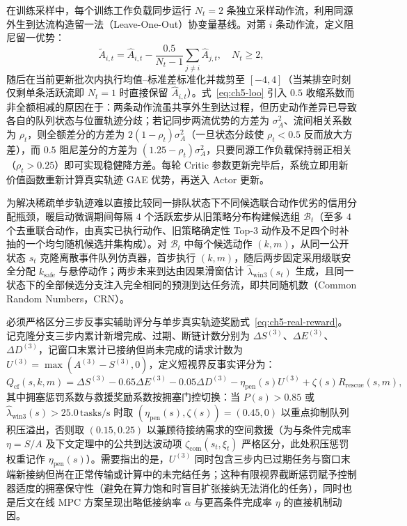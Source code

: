 在训练采样中，每个训练工作负载同步运行 $N_t=2$ 条独立采样动作流，利用同源外生到达流构造留一法（Leave-One-Out）协变量基线\cite{kool2019buy}。对第 $i$ 条动作流，定义阻尼留一优势：
\begin{equation}
 \widetilde A_{i,t}=\widehat A_{i,t}
 -\frac{0.5}{N_t-1}\sum_{j\neq i}\widehat A_{j,t},\quad N_t\geq2,
 \label{eq:ch5-loo}
\end{equation}
随后在当前更新批次内执行均值--标准差标准化并裁剪至 $[-4,4]$（当某排空时刻仅剩单条活跃流即 $N_t=1$ 时直接保留 $\widehat A_{i,t}$）。式~\eqref{eq:ch5-loo} 引入 $0.5$ 收缩系数而非全额相减的原因在于：两条动作流虽共享外生到达过程，但历史动作差异已导致各自的队列状态与位置轨迹分歧；若记同步两流优势的方差为 $\sigma_A^2$、流间相关系数为 $\rho_t$，则全额差分的方差为 $2(1-\rho_t)\sigma_A^2$（一旦状态分歧使 $\rho_t<0.5$ 反而放大方差），而 $0.5$ 阻尼差分的方差为 $(1.25-\rho_t)\sigma_A^2$，只要同源工作负载保持弱正相关（$\rho_t>0.25$）即可实现稳健降方差。每轮 Critic 参数更新完毕后，系统立即用新价值函数重新计算真实轨迹 GAE 优势，再送入 Actor 更新。

为解决稀疏单步轨迹难以直接比较同一排队状态下不同候选联合动作优劣的信用分配瓶颈，暖启动微调期间每隔 $4$ 个活跃宏步从旧策略分布构建候选组 $\mathcal{B}_t$（至多 $4$ 个去重联合动作，由真实已执行动作、旧策略确定性 Top-3 动作及不足四个时补抽的一个均匀随机候选并集构成）。对 $\mathcal{B}_t$ 中每个候选动作 $(k,m)$，从同一公开状态 $s_t$ 克隆离散事件队列仿真器，首步执行 $(k,m)$，随后两步固定采用级联安全分配 $k_{\mathrm{safe}}$ 与悬停动作；两步未来到达由因果滑窗估计 $\hat{\lambda}_{\mathrm{win3}}(s_t)$ 生成，且同一状态下的全部候选分支注入完全相同的预测到达任务流，即共同随机数（Common Random Numbers，CRN）。

必须严格区分三步反事实辅助评分与单步真实轨迹奖励式~\eqref{eq:ch5-real-reward}。记克隆分支三步内累计新增完成、过期、断链计数分别为 $\Delta S^{(3)}$、$\Delta E^{(3)}$、$\Delta D^{(3)}$，记窗口末累计已接纳但尚未完成的请求计数为 $U^{(3)}=\max(A^{(3)}-S^{(3)},0)$，定义短视界反事实评分为：
\begin{equation}
 Q_{\mathrm{cf}}(s,k,m)=\Delta S^{(3)}-0.65\Delta E^{(3)}-0.05\Delta D^{(3)}
 -\eta_{\mathrm{pen}}(s)U^{(3)}+\zeta(s)R_{\mathrm{rescue}}(s,m),
 \label{eq:ch5-cf-score}
\end{equation}
其中拥塞惩罚系数与救援奖励系数按拥塞门控切换：当 $P(s)>0.85$ 或 $\hat\lambda_{\mathrm{win3}}(s)>25.0\,\mathrm{tasks/s}$ 时取 $(\eta_{\mathrm{pen}}(s),\zeta(s))=(0.45,0)$ 以重点抑制队列积压溢出，否则取 $(0.15,0.25)$ 以兼顾待接纳需求的空间救援（为与条件完成率 $\eta=S/A$ 及下文定理中的公共到达波动项 $\zeta_{\mathrm{com}}(s_t,\xi_t)$ 严格区分，此处积压惩罚权重记作 $\eta_{\mathrm{pen}}(s)$）。需要指出的是，$U^{(3)}$ 同时包含三步内已过期任务与窗口末端新接纳但尚在正常传输或计算中的未完结任务；这种有限视界截断惩罚赋予控制器适度的拥塞保守性（避免在算力饱和时盲目扩张接纳无法消化的任务），同时也是后文在线 MPC 方案呈现出略低接纳率 $\alpha$ 与更高条件完成率 $\eta$ 的直接机制动因。

